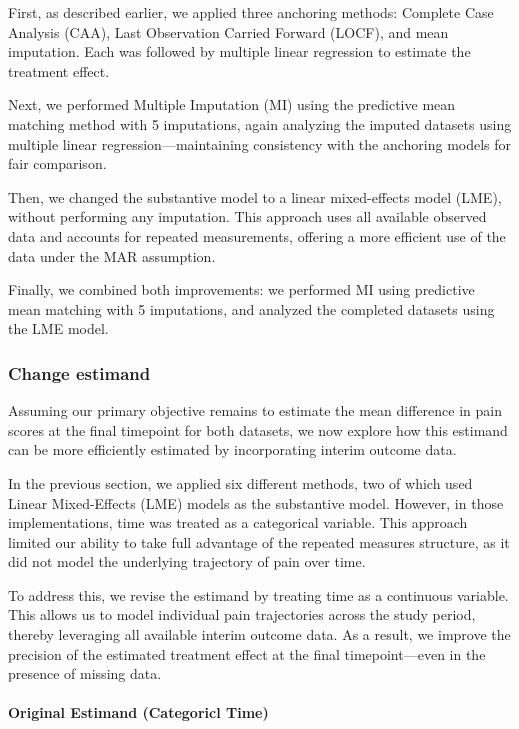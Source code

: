 \documentclass{article}
\begin{document}
First, as described earlier, we applied three anchoring methods:
Complete Case Analysis (CAA), Last Observation Carried Forward (LOCF),
and mean imputation. Each was followed by multiple linear regression to
estimate the treatment effect.

Next, we performed Multiple Imputation (MI) using the predictive mean
matching method with 5 imputations, again analyzing the imputed datasets
using multiple linear regression---maintaining consistency with the
anchoring models for fair comparison.

Then, we changed the substantive model to a linear mixed-effects model
(LME), without performing any imputation. This approach uses all
available observed data and accounts for repeated measurements, offering
a more efficient use of the data under the MAR assumption.

Finally, we combined both improvements: we performed MI using predictive
mean matching with 5 imputations, and analyzed the completed datasets
using the LME model.

\subsubsection{Change estimand}\label{change-estimand}

Assuming our primary objective remains to estimate the mean difference
in pain scores at the final timepoint for both datasets, we now explore
how this estimand can be more efficiently estimated by incorporating
interim outcome data.

In the previous section, we applied six different methods, two of which
used Linear Mixed-Effects (LME) models as the substantive model.
However, in those implementations, time was treated as a categorical
variable. This approach limited our ability to take full advantage of
the repeated measures structure, as it did not model the underlying
trajectory of pain over time.

To address this, we revise the estimand by treating time as a continuous
variable. This allows us to model individual pain trajectories across
the study period, thereby leveraging all available interim outcome data.
As a result, we improve the precision of the estimated treatment effect
at the final timepoint---even in the presence of missing data.

\paragraph{Original Estimand (Categoricl
Time)}\label{original-estimand-categoricl-time}
\end{document}
